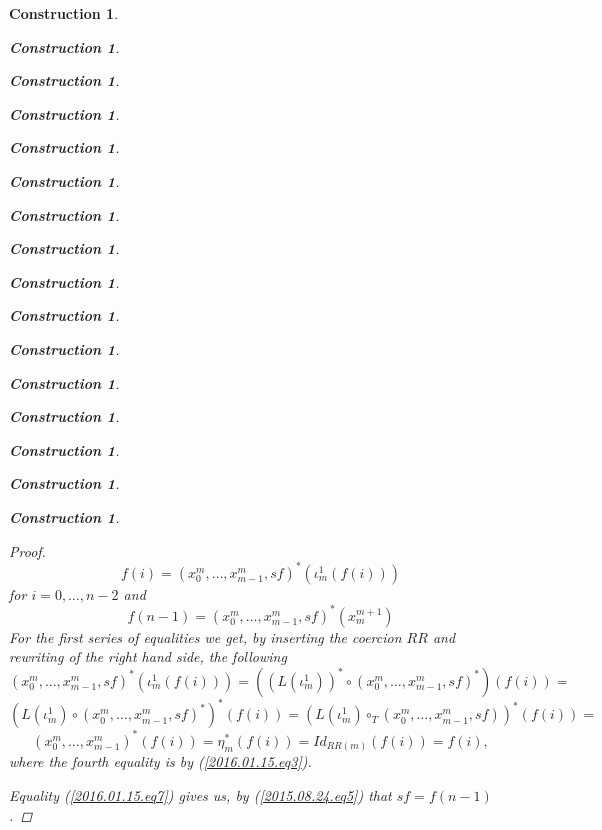 \documentclass[12pt]{amsart}
\newenvironment{eq}{\begin{equation}}{\end{equation}}
\newtheorem{construction}[proposition]{Construction}
\newcommand{\llabel}[1]{\label{#1}}
\newcommand{\mbind}[1]{{#1^*}}
\newcommand{\hc}{\circ_{T}}
\begin{document}
\begin{construction}
\begin{construction}
\begin{construction}
\begin{construction}
\begin{construction}
\begin{construction}
\begin{construction}
\begin{construction}
\begin{construction}
\begin{construction}
\begin{construction}
\begin{construction}
\begin{construction}
\begin{construction}
\begin{construction}
\begin{construction}
\begin{proof}
\begin{eq}
f(i)=\mbind{(x_0^m,\dots,x_{m-1}^m,sf)}(\iota_m^1(f(i)))
\end{eq}%
%
for $i=0,\dots,n-2$ and 
%
\begin{eq}\llabel{2016.01.15.eq7}
f(n-1)=\mbind{(x_0^m,\dots,x_{m-1}^m,sf)}(x_{m}^{m+1})
\end{eq}%
%
For the first series of equalities we get, by inserting the coercion $RR$ and
rewriting of the right hand side, the following
%
$$\mbind{(x_0^m,\dots,x_{m-1}^m,sf)}(\iota_m^1(f(i)))=(\mbind{(L(\iota_m^1))}\circ \mbind{(x_0^m,\dots,x_{m-1}^m,sf)})(f(i))=$$$$\mbind{(L(\iota_m^1)\circ \mbind{(x_0^m,\dots,x_{m-1}^m,sf)})}(f(i))=\mbind{(L(\iota_m^1)\hc (x_0^m,\dots,x_{m-1}^m,sf))}(f(i))=$$$$\mbind{(x_0^m,\dots,x_{m-1}^m)}(f(i))=\mbind{\eta_{m}}(f(i))=Id_{RR(m)}(f(i))=f(i),$$
%
where the fourth equality is by (\ref{2016.01.15.eq3}). 

Equality (\ref{2016.01.15.eq7}) gives us, by (\ref{2015.08.24.eq5}) that $sf=f(n-1)$.
\end{proof}
%
%


\end{construction}
\end{construction}
\end{construction}
\end{construction}
\end{construction}
\end{construction}
\end{construction}
\end{construction}
\end{construction}
\end{construction}
\end{construction}
\end{construction}
\end{construction}
\end{construction}
\end{construction}
\end{construction}
\end{document}
